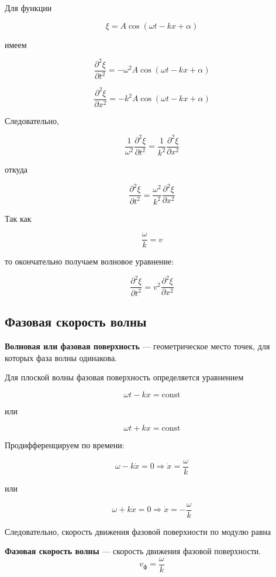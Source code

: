 \documentclass[a4paper,12pt]{article}
\begin{document}
Для функции

\[
\xi = A \cos(\omega t - kx + \alpha)
\]

имеем

\[
\frac{\partial^2 \xi}{\partial t^2}
=
-\omega^2 A \cos(\omega t - kx + \alpha)
\]

\[
\frac{\partial^2 \xi}{\partial x^2}
=
-k^2 A \cos(\omega t - kx + \alpha)
\]

Следовательно,

\[
\frac{1}{\omega^2}\frac{\partial^2 \xi}{\partial t^2}
=
\frac{1}{k^2}\frac{\partial^2 \xi}{\partial x^2}
\]

откуда

\[
\frac{\partial^2 \xi}{\partial t^2}
=
\frac{\omega^2}{k^2}\frac{\partial^2 \xi}{\partial x^2}
\]

Так как

\[
\frac{\omega}{k} = v
\]

то окончательно получаем волновое уравнение:

\[
\frac{\partial^2 \xi}{\partial t^2}
=
v^2 \frac{\partial^2 \xi}{\partial x^2}
\]

\subsection*{Фазовая скорость волны}

\begin{definitionbox}
\textbf{Волновая или фазовая поверхность} — геометрическое место точек, для которых фаза волны одинакова.
\end{definitionbox}

Для плоской волны фазовая поверхность определяется уравнением

\[
\omega t - kx = \mathrm{const}
\]

или

\[
\omega t + kx = \mathrm{const}
\]

Продифференцируем по времени:

\[
\omega - k\dot{x} = 0
\Rightarrow
\dot{x} = \frac{\omega}{k}
\]

или

\[
\omega + k\dot{x} = 0
\Rightarrow
\dot{x} = -\frac{\omega}{k}
\]

Следовательно, скорость движения фазовой поверхности по модулю равна



\begin{definitionbox}
\textbf{Фазовая скорость волны} — скорость движения фазовой поверхности.
\[
v_{\text{ф}} = \frac{\omega}{k}
\]
\end{definitionbox}
\end{document}
